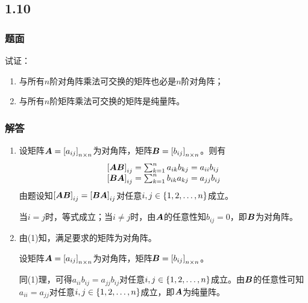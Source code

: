 \documentclass{beamer}
\begin{document}
\subsection*{1.10}

\begin{frame}
\frametitle{题面}

试证：
\begin{enumerate}
    \item 与所有\(n\)阶对角阵乘法可交换的矩阵也必是\(n\)阶对角阵；
    \item 与所有\(n\)阶矩阵乘法可交换的矩阵是纯量阵。
\end{enumerate}

\end{frame}

\begin{frame}
\frametitle{解答}

    \begin{enumerate}
        \item
              {
              设矩阵\(\boldsymbol{A}=\left[ a_{ij} \right]_{n\times n}\)为对角阵，矩阵\(\boldsymbol{B}=\left[ b_{ij} \right]_{n\times n}\)。则有
              \begin{equation*}
                  \begin{array}{lll}
                      \left[ \boldsymbol{A}\boldsymbol{B} \right]_{ij}=\sum_{k=1}^na_{ik}b_{kj}=a_{ii}b_{ij} \\
                      \left[ \boldsymbol{B}\boldsymbol{A} \right]_{ij}=\sum_{k=1}^nb_{ik}a_{kj}=a_{jj}b_{ij}
                  \end{array}
              \end{equation*}
              由题设知\(\left[ \boldsymbol{A}\boldsymbol{B} \right]_{ij}=\left[ \boldsymbol{B}\boldsymbol{A} \right]_{ij}\)对任意\(i,j\in\left\{1,2,\dots,n \right\}\)成立。

              当\(i=j\)时，等式成立；当\(i\neq j\)时，由\(\boldsymbol{A}\)的任意性知\(b_{ij}=0\)，即\(\boldsymbol{B}\)为对角阵。
              }
              \pause
        \item
              {
              由(1)知，满足要求的矩阵为对角阵。

              设矩阵\(\boldsymbol{A}=\left[ a_{ij} \right]_{n\times n}\)为对角阵，矩阵\(\boldsymbol{B}=\left[ b_{ij} \right]_{n\times n}\)。

              同(1)理，可得\(a_{ii}b_{ij}=a_{jj}b_{ij}\)对任意\(i,j\in\left\{1,2,\dots,n \right\}\)成立。由\(\boldsymbol{B}\)的任意性可知\(a_{ii}=a_{jj}\)对任意\(i,j\in\left\{1,2,\dots,n \right\}\)成立，即\(\boldsymbol{A}\)为纯量阵。
              }
    \end{enumerate}

\end{frame}
\end{document}
